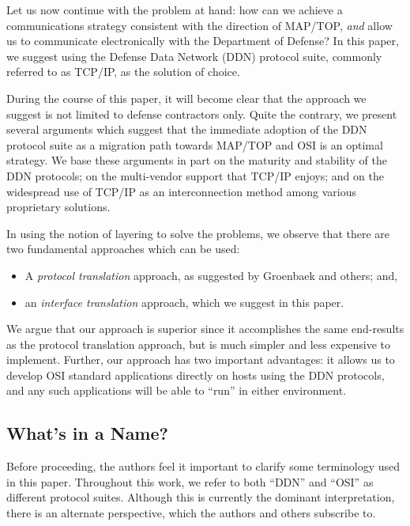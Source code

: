 Let us now continue with the problem at hand:
how can we achieve a communications strategy consistent with the
direction of MAP/TOP,
{\em and\/} allow us to communicate electronically with the Department of
Defense?
In this paper,
we suggest using the Defense Data Network (DDN) protocol suite,
commonly referred to as TCP/IP,
as the solution of choice.

During the course of this paper,
it will become clear that the approach we suggest is not limited to
defense contractors only.
Quite the contrary,
we present several arguments which suggest that the
immediate adoption of the DDN protocol suite as a migration path
towards MAP/TOP and OSI is an optimal strategy.
We base these arguments in part on the maturity and stability of the DDN
protocols;
on the multi-vendor support that TCP/IP enjoys;
and on
the widespread use of TCP/IP as an interconnection method among various
proprietary solutions.

In using the notion of layering to solve the problems,
we observe that there are two fundamental approaches which can be used:
\begin{itemize}
\item	A {\em protocol translation\/} approach, as suggested by
	Groenbaek\cite{TCP.convert.ISO} and others;
	and,

\item	an {\em interface translation\/} approach, which we suggest in this
	paper.
\end{itemize}
We argue that our approach is superior since it accomplishes the same
end-results as the protocol translation approach,
but is much simpler and less expensive to implement.
Further,
our approach has two important advantages:
it allows us to develop OSI standard applications directly on hosts using the
DDN protocols,
and any such applications will be able to ``run'' in either environment.

\subsection	{What's in a Name?}
Before proceeding,
the authors feel it important to clarify some terminology used in this paper.
Throughout this work,
we refer to both ``DDN'' and ``OSI'' as different protocol suites.
Although this is currently the dominant interpretation,
there is an alternate perspective, which the authors and others subscribe to.

